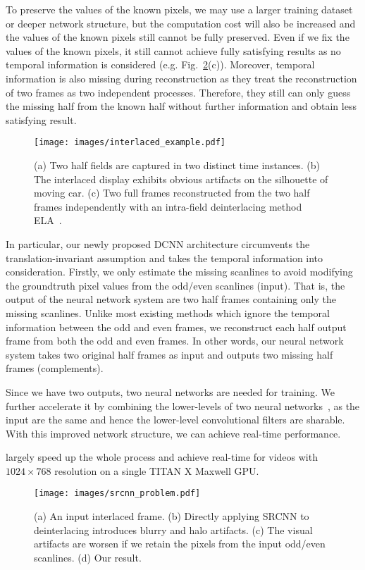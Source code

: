 \documentclass[acmtog]{acmart}
\begin{document}
To
preserve the values of the known pixels, we may use a larger training dataset or
deeper network structure, but the computation cost will also be increased and
the values of the known pixels still cannot be fully preserved. Even if we fix
the values of the known pixels, it still cannot achieve fully satisfying results
as no temporal information is considered (e.g. Fig.~\ref{fig:srcnn_problem}(c)).
Moreover, temporal information is also missing during reconstruction as they
treat the reconstruction of two frames as two independent processes. Therefore,
they still can only guess the missing half from the known half without further
information and obtain less satisfying result. 
\fi\begin{figure}[!tp]	
	\texttt{[image: images/interlaced\_example.pdf]}\\
	\caption{(a) Two half fields are captured in two distinct time instances. 
	(b) The interlaced display exhibits obvious artifacts on the silhouette of moving car.
	(c) Two full frames	reconstructed from the two half frames independently with an intra-field deinterlacing method ELA~\cite{doyle1990interlaced}.} \label{fig:interlaced_example}
\end{figure}%

In particular, our newly proposed DCNN architecture circumvents the translation-invariant assumption and takes the temporal
information into consideration. Firstly, we only estimate the missing scanlines
to avoid modifying the groundtruth pixel values from the odd/even scanlines
(input). That is, the output of the neural network system are two half frames
containing only the missing scanlines. Unlike most existing methods which ignore the
temporal information between the odd and even frames, we reconstruct each half 
output frame from both the odd and even frames. In other words,
 our
neural network system takes two original half frames as input and outputs two missing half
frames (complements). 

Since we have two outputs, two neural networks are needed for training. 
We further accelerate it by combining the lower-levels of two
neural networks~\cite{bengio2012deep}, as the input are the same and 
hence the lower-level convolutional filters are sharable. 
With this improved network structure, we can achieve real-time performance.

largely speed up the whole process and achieve real-time for videos with
$1024\times768$ resolution on a single TITAN X Maxwell GPU. 
\fi\begin{figure}[!tp]
\texttt{[image: images/srcnn\_problem.pdf]}\\
\caption{(a) An input interlaced frame. 
(b) Directly applying SRCNN to deinterlacing introduces blurry and halo artifacts. 
(c) The visual artifacts are worsen if we retain the pixels from the input odd/even scanlines. 
(d) Our result.}\label{fig:srcnn_problem} 
\end{figure}
\end{document}
